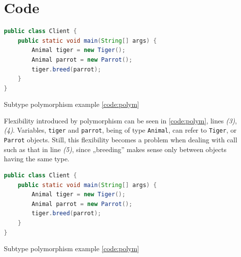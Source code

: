 \section{Code}

\begin{code}
	\begin{lstlisting}[language=Java]
public class Client {
    public static void main(String[] args) {
        Animal tiger = new Tiger();
        Animal parrot = new Parrot();
        tiger.breed(parrot);
    }
}
	\end{lstlisting}
	\caption{Subtype polymorphism example \cref{code:polym}}
	\label{code:polym}
\end{code}
Flexibility introduced by polymorphism can be seen in \cref{code:polym}, lines \textit{(3)}, \textit{(4)}. Variables, \texttt{tiger} and \texttt{parrot}, being of type \texttt{Animal}, can refer to \texttt{Tiger}, or \texttt{Parrot} objects. Still, this flexibility becomes a problem when dealing with call such as that in line \textit{(5)}, since „breeding” makes sense only between objects having the same type.

\begin{code}[H]
	\begin{lstlisting}[language=Java]
public class Client {
	public static void main(String[] args) {
		Animal tiger = new Tiger();
		Animal parrot = new Parrot();
		tiger.breed(parrot);
	}
}
	\end{lstlisting}
	\caption{Subtype polymorphism example \cref{code:polym}}
	\label{code:polym2}
\end{code}